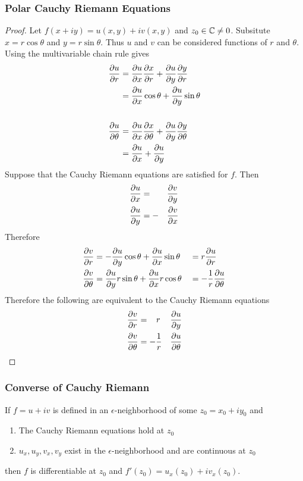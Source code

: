\documentclass[../notes.tex]{subfiles}
\begin{document}
\subsubsection{Polar Cauchy Riemann Equations}

\begin{proof}
    Let $f(x + iy) = u(x,y) + iv(x,y)$ and $z_0 \in \mathbb{C} \neq 0$. Subsitute $x = r \cos \theta$ and $y = r \sin \theta$. Thus $u$ and $v$ can be considered functions of $r$ and $\theta$. Using the multivariable chain rule gives
    \begin{align*}
        \pdv{u}{r} &= \pdv{u}{x} \pdv{x}{r} + \pdv{u}{y} \pdv{y}{r} \\
                   &= \pdv{u}{x} \cos \theta + \pdv{u}{y} \sin \theta \\ 
                   \\
        \pdv{u}{\theta} &= \pdv{u}{x} \pdv{x}{\theta} + \pdv{u}{y} \pdv{y}{\theta} \\
                   &= \pdv{u}{x} (-r\sin \theta)  + \pdv{u}{y} (r \cos \theta)
    \end{align*}
    Suppose that the Cauchy Riemann equations are satisfied for $f$. Then
    \begin{alignat*}{2}
        \pdv{u}{x} &= &&\pdv{v}{y} \\
        \pdv{u}{y} &= -&&\pdv{v}{x}
    \end{alignat*}
    Therefore
    \begin{alignat*}{2}
        \pdv{v}{r} &= -\pdv{u}{y} \cos \theta + \pdv{u}{x} \sin \theta &&= r \pdv{u}{r} \\
        \pdv{v}{\theta} &= \pdv{u}{y} r\sin \theta + \pdv{u}{x} r\cos \theta &&= -\frac{1}{r} \pdv{u}{\theta}
    \end{alignat*}
    Therefore the following are equivalent to the Cauchy Riemann equations
    \begin{alignat*}{2}
        \pdv{v}{r} &= \;\;\; r&&\pdv{u}{y} \\
        \pdv{v}{\theta} &= -\frac{1}{r}&&\pdv{u}{\theta}
    \end{alignat*}
\end{proof}

\subsubsection{Converse of Cauchy Riemann}

\begin{theorem}[Converse of C.R.]
    If $f = u + iv$ is defined in an $\epsilon$-neighborhood of some $z_0 = x_0 + iy_0$ and
    \begin{enumerate}
        \item The Cauchy Riemann equations hold at $z_0$
        \item $u_x, u_y, v_x, v_y$ exist in the $\epsilon$-neighborhood and are continuous at $z_0$
    \end{enumerate}
    then $f$ is differentiable at $z_0$ and $f'(z_0) = u_x(z_0) + iv_x(z_0)$.
\end{theorem}
\end{document}
